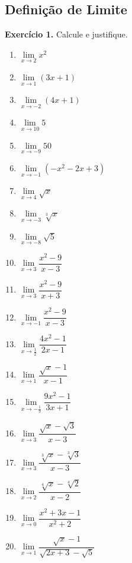 \documentclass[12pt,a4paper]{article}
\begin{document}
\subsection{Definição de Limite}
\vspace{0.5cm}
\noindent\textbf{Exercício 1.} Calcule e justifique.
\begin{enumerate}
    \renewcommand{\theenumi}{\alph{enumi}}
    \renewcommand{\labelenumi}{\theenumi)}
    \item $\lim\limits_{x \to 2} x^2$
    \item $\lim\limits_{x \to 1} (3x + 1)$
    \item $\lim\limits_{x \to -2} (4x + 1)$
    \item $\lim\limits_{x \to 10} 5$
    \item $\lim\limits_{x \to -9} 50$
    \item $\lim\limits_{x \to -1} (-x^2 - 2x + 3)$
    \item $\lim\limits_{x \to 4} \sqrt{x}$
    \item $\lim\limits_{x \to -3} \sqrt[3]{x}$
    \item $\lim\limits_{x \to -8} \sqrt{5}$
    \item $\lim\limits_{x \to 3} \dfrac{x^2 - 9}{x - 3}$
    \item $\lim\limits_{x \to 3} \dfrac{x^2 - 9}{x + 3}$
    \item $\lim\limits_{x \to -1} \dfrac{x^2 - 9}{x - 3}$
    \item $\lim\limits_{x \to \frac{1}{2}} \dfrac{4x^2 - 1}{2x - 1}$
    \item $\lim\limits_{x \to 1} \dfrac{\sqrt{x} - 1}{x - 1}$
    \item $\lim\limits_{x \to -\frac{1}{3}} \dfrac{9x^2 - 1}{3x + 1}$
    \item $\lim\limits_{x \to 3} \dfrac{\sqrt{x} - \sqrt{3}}{x - 3}$
    \item $\lim\limits_{x \to 3} \dfrac{\sqrt[3]{x} - \sqrt[3]{3}}{x - 3}$
    \item $\lim\limits_{x \to 2} \dfrac{\sqrt[4]{x} - \sqrt[4]{2}}{x - 2}$
    \item $\lim\limits_{x \to 0} \dfrac{x^2 + 3x - 1}{x^2 + 2}$
    \item $\lim\limits_{x \to 1} \dfrac{\sqrt{x} - 1}{\sqrt{2x + 3} - \sqrt{5}}$
\end{enumerate}
\end{document}
